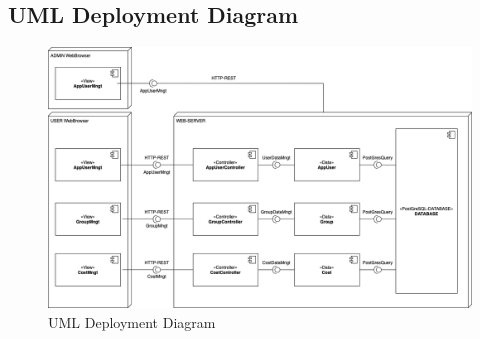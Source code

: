 \subsection{UML Deployment Diagram}

\begin{figure}[H]
    \centering
    \includegraphics[width=1.1\textwidth, trim=3cm 0cm 1cm 0cm]{images/DeployementDiagramIterazione2.drawio.png}
    \caption{UML Deployment Diagram}
    \label{fig:uml-deployment-diagram}
\end{figure}

